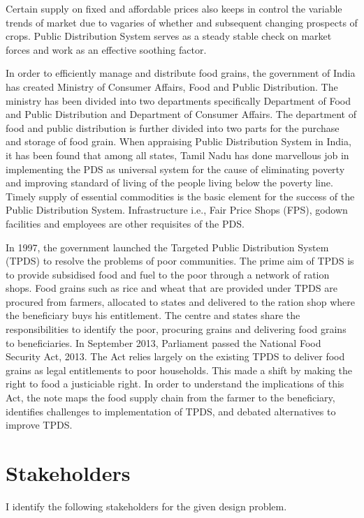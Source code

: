 \documentclass{article}
\begin{document}
Certain supply on fixed and affordable prices also keeps in control the variable trends of market due to vagaries of whether and subsequent changing prospects of crops. Public Distribution System serves as a steady stable check on market forces and work as an effective soothing factor. \par
In order to efficiently manage and distribute food grains, the government of India has created Ministry of Consumer Affairs, Food and Public Distribution. The ministry has been divided into two departments specifically Department of Food and Public Distribution and Department of Consumer Affairs. The department of food and public distribution is further divided into two parts for the purchase and storage of food grain. When appraising Public Distribution System in India, it has been found that among all states, Tamil Nadu has done marvellous job in implementing the PDS as universal system for the cause of eliminating poverty and improving standard of living of the people living below the poverty line. Timely supply of essential commodities is the basic element for the success of the Public Distribution System. Infrastructure i.e., Fair Price Shops (FPS), godown facilities and employees are other requisites of the PDS. \par
In 1997, the government launched the Targeted Public Distribution System (TPDS) to resolve the problems of poor communities. The prime aim of TPDS is to provide subsidised food and fuel to the poor through a network of ration shops. Food grains such as rice and wheat that are provided under TPDS are procured from farmers, allocated to states and delivered to the ration shop where the beneficiary buys his entitlement. The centre and states share the responsibilities to identify the poor, procuring grains and delivering food grains to beneficiaries. In September 2013, Parliament passed the National Food Security Act, 2013. The Act relies largely on the existing TPDS to deliver food grains as legal entitlements to poor households. This made a shift by making the right to food a justiciable right. In order to understand the implications of this Act, the note maps the food supply chain from the farmer to the beneficiary, identifies challenges to implementation of TPDS, and debated alternatives to improve TPDS.


\section{Stakeholders}

I identify the following stakeholders for the given design problem.
\end{document}
